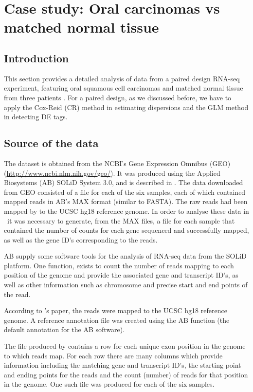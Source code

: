 
\section{Case study: Oral carcinomas vs matched normal tissue}\label{tuch}
\subsection{Introduction}
This section provides a detailed analysis of data from a paired design
RNA-seq experiment, featuring oral squamous cell carcinomas and
matched normal tissue from three patients \citep{Tuch:2010p457}. For a
paired design, as we discussed before, we have to apply the Cox-Reid
(CR) method in estimating dispersions and the GLM method in detecting
DE tags.

\subsection{Source of the data}
The dataset is obtained from the NCBI's Gene Expression Omnibus (GEO)
(\url{http://www.ncbi.nlm.nih.gov/geo/}). It was produced using the
Applied Biosystems (AB) SOLiD System 3.0, and is described in
\citet{Tuch:2010p457}. The data downloaded from GEO consisted of a
file for each of the six samples, each of which contained mapped reads
in AB's MAX format (similar to FASTA). The raw reads had been mapped
by \citet{Tuch:2010p457} to the UCSC hg18 reference genome. In order
to analyse these data in \R\ it was necessary to generate, from the
MAX files, a file for each sample that contained the number of counts
for each gene sequenced and successfully mapped, as well as the gene
ID's corresponding to the reads.

AB supply some software tools for the analysis of RNA-seq data from
the SOLiD platform. One function,  exists to
count the number of reads mapping to each position of the genome and
provide the associated gene and transcript ID's, as well as other
information such as chromosome and precise start and end points of the
read.

According to \citet{Tuch:2010p457}'s paper, the reads were mapped to
the UCSC hg18 reference genome. A reference annotation file was
created using the AB function  (the default
annotation for the AB software).

The file produced by  contains a row for each
unique exon position in the genome to which reads map. For each row
there are many columns which provide information including the
matching gene and transcript ID's, the starting point and ending
points for the reads and the count (number) of reads for that position
in the genome. One such file was produced for each of the six samples.

